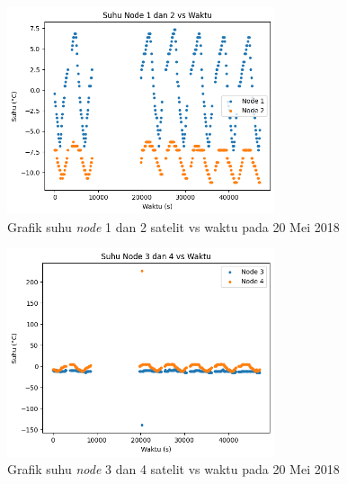 \begin{figure}[H]
\setlength{}
\begin{center}
\includegraphics[width=0.7\textwidth]{fig/raw_node12_temp_2018-05-20.png}
	\caption{Grafik suhu \textit{node} 1 dan 2 satelit vs waktu pada 20 Mei 2018}
\label{fig:rawtemp1220}
\end{center}
\end{figure}

\begin{figure}[H]
\setlength{}
\begin{center}
\includegraphics[width=0.7\textwidth]{fig/raw_node34_temp_2018-05-20.png}
	\caption{Grafik suhu \textit{node} 3 dan 4 satelit vs waktu pada 20 Mei 2018}
\label{fig:rawtemp3420}
\end{center}
\end{figure}

